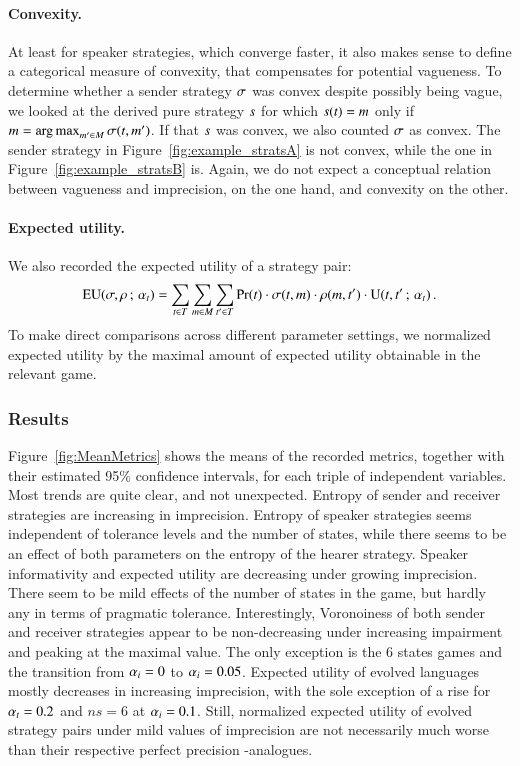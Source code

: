\paragraph{Convexity.} At least for speaker strategies, which converge
faster, it also makes sense to define a categorical measure of
convexity, that compensates for potential vagueness. To determine
whether a sender strategy $\sigma$ was convex despite possibly being
vague, we looked at the derived pure strategy $s$ for which
$s(t) = m$ only if $m =
\operatorname*{arg\,max}_{m' \in M} \sigma(t,m')$. If that $s$
was convex, we also counted $\sigma$ as convex. The sender strategy
in Figure~\ref{fig:example_stratsA} is not convex, while the one in
Figure~\ref{fig:example_stratsB} is. Again, we do not expect a
conceptual relation between vagueness and imprecision, on the one
hand, and convexity on the other.

\paragraph{Expected utility.} We also recorded the expected utility of
a strategy pair:
\begin{align*}
  \mathrm{EU}(\sigma,\rho \thinspace ; \thinspace \alpha_t) = \sum_{t \in
    T} \sum_{m \in M} \sum_{t' \in T}
  \Pr(t) \cdot \sigma(t, m) \cdot \rho(m,
  t') \cdot \mathrm{U}(t,t' \thinspace ; \thinspace \alpha_t)\,.
\end{align*}
To make direct comparisons across different parameter settings, we
normalized expected utility by the maximal amount of expected utility
obtainable in the relevant game.

\subsubsection{Results}
Figure~\ref{fig:MeanMetrics} shows the means of the recorded metrics,
together with their estimated 95\% confidence intervals, for each
triple of independent variables. Most trends are quite clear, and not
unexpected. Entropy of sender and receiver strategies are increasing
in imprecision. Entropy of speaker strategies seems independent of
tolerance levels and the number of states, while there seems to be an
effect of both parameters on the entropy of the hearer
strategy. Speaker informativity and expected utility are decreasing
under growing imprecision. There seem to be mild effects of the number
of states in the game, but hardly any in terms of pragmatic
tolerance. Interestingly, Voronoiness of both sender and receiver
strategies appear to be non-decreasing under increasing impairment and
peaking at the maximal value. The only exception is the 6 states games
and the transition from $\alpha_i = 0$ to $\alpha_i =
0.05$. Expected utility of evolved languages mostly decreases in
increasing imprecision, with the sole exception of a rise for $\alpha_t
= 0.2$ and $ns = 6$ at $\alpha_i = 0.1$. Still, normalized expected
utility of evolved strategy pairs under mild values of imprecision are
not necessarily much worse than their respective perfect precision
\rd-analogues. 

